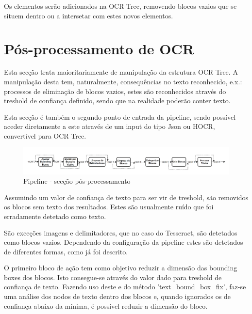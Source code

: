Os elementos serão adicionados na OCR Tree, removendo blocos vazios que se situem dentro ou a intersetar com estes novos elementos.



\section{Pós-processamento de OCR}



Esta secção trata maioritariamente de manipulação da estrutura OCR Tree. A manipulação desta tem, naturalmente, consequências no texto reconhecido, e.x.: processos de eliminação de blocos vazios, estes são reconhecidos através do treshold de confiança definido, sendo que na realidade poderão conter texto.

Esta secção é também o segundo ponto de entrada da pipeline, sendo possível aceder diretamente a este através de um input do tipo Json ou HOCR, convertível para OCR Tree.


\begin{figure}[H]
	\centering
	\includegraphics[width=1\textwidth]{images/diagramas/arquitetura_pipeline_posprocess.png}
	\caption{Pipeline - secção pós-processamento}
	\label{fig:arquitetura_pipeline_posprocess}
\end{figure}



Assumindo um valor de confiança de texto para ser vir de treshold, são removidos os blocos sem texto dos resultados. Estes são usualmente ruído que foi erradamente detetado como texto. 

São exceções imagens e delimitadores, que no caso do Tesseract, são detetados como blocos vazios. Dependendo da configuração da pipeline estes são detetados de diferentes formas, como já foi descrito.




O primeiro bloco de ação tem como objetivo reduzir a dimensão das bounding boxes dos blocos. Isto consegue-se através do valor dado para treshold de confiança de texto. Fazendo uso deste e do método 'text\_bound\_box\_fix', faz-se uma análise dos nodos de texto dentro dos blocos e, quando ignorados os de confiança abaixo da mínima, é possível reduzir a dimensão do bloco.

